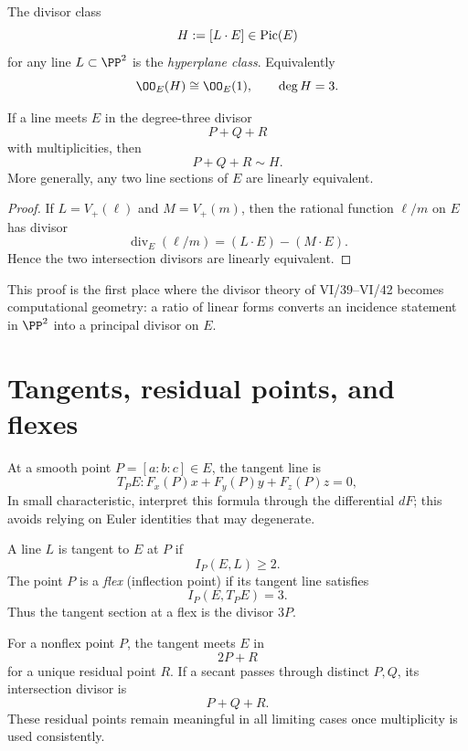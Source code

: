 \begin{definition}\label{def:vi43-hyperplane-class}
The divisor class
\[
  H:=[L\cdot E]\in\operatorname{Pic}(E)
\]
for any line \(L\subset\PP^2\) is the \emph{hyperplane class}.  Equivalently
\[
  \OO_E(H)\cong\OO_E(1),
  \qquad
  \deg H=3.
\]
\end{definition}

\begin{theorem}\label{thm:vi43-collinear-divisor}
If a line meets \(E\) in the degree-three divisor
\[
  P+Q+R
\]
with multiplicities, then
\[
  P+Q+R\sim H.
\]
More generally, any two line sections of \(E\) are linearly equivalent.
\end{theorem}

\begin{proof}
If \(L=V_+(\ell)\) and \(M=V_+(m)\), then the rational function \(\ell/m\) on \(E\) has divisor
\[
  \operatorname{div}_E(\ell/m)
  =(L\cdot E)-(M\cdot E).
\]
Hence the two intersection divisors are linearly equivalent.
\end{proof}

This proof is the first place where the divisor theory of VI/39--VI/42 becomes computational geometry: a ratio of linear forms converts an incidence statement in \(\PP^2\) into a principal divisor on \(E\).

\section{Tangents, residual points, and flexes}

At a smooth point \(P=[a:b:c]\in E\), the tangent line is
\[
  T_PE:
  F_x(P)x+F_y(P)y+F_z(P)z=0,
\]
In small characteristic, interpret this formula through the differential \(dF\); this avoids relying on Euler identities that may degenerate.

\begin{definition}\label{def:vi43-flex}
A line \(L\) is tangent to \(E\) at \(P\) if
\[
  I_P(E,L)\ge2.
\]
The point \(P\) is a \emph{flex} (inflection point) if its tangent line satisfies
\[
  I_P(E,T_PE)=3.
\]
Thus the tangent section at a flex is the divisor \(3P\).
\end{definition}

For a nonflex point \(P\), the tangent meets \(E\) in
\[
  2P+R
\]
for a unique residual point \(R\).  If a secant passes through distinct \(P,Q\), its intersection divisor is
\[
  P+Q+R.
\]
These residual points remain meaningful in all limiting cases once multiplicity is used consistently.

